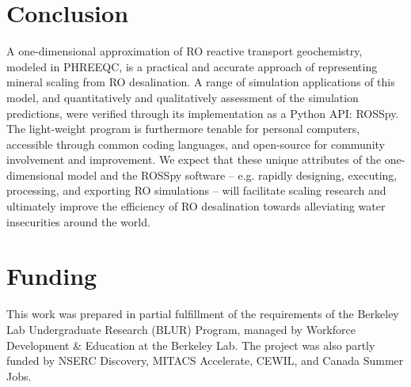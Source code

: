 \section{Conclusion}

A one-dimensional approximation of RO reactive transport geochemistry, modeled in PHREEQC, is a practical and accurate approach of representing mineral scaling from RO desalination. A range of simulation applications of this model, and quantitatively and qualitatively assessment of the simulation predictions, were verified through its implementation as a Python API: ROSSpy. The light-weight program is furthermore tenable for personal computers, accessible through common coding languages, and open-source for community involvement and improvement. We expect that these unique attributes of the one-dimensional model and the ROSSpy software -- e.g. rapidly designing, executing, processing, and exporting RO simulations -- will facilitate scaling research and ultimately improve the efficiency of RO desalination towards alleviating water insecurities around the world. 


\section{Funding}
This work was prepared in partial fulfillment of the requirements of the Berkeley Lab Undergraduate Research (BLUR) Program, managed by Workforce Development \& Education at the Berkeley Lab. The project was also partly funded by NSERC Discovery, MITACS Accelerate, CEWIL, and Canada Summer Jobs. 

% 